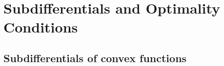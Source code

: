 



\section{Subdifferentials and Optimality Conditions}
\subsection{Subdifferentials of convex functions}


